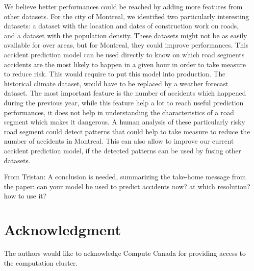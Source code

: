 \documentclass[conference]{IEEEtran}
\newcommand{\TG}[1]{\colorlet{saved}{.}\color{orange}From Tristan: #1\color{saved}}
\begin{document}
We believe better performances could be reached by adding more features
from other datasets. For the city of Montreal, we identified two
particularly interesting datasets: a dataset with the location and dates of
construction work on roads, and a dataset with the population density.
These datasets might not be as easily available for over areas, but for
Montreal, they could improve performances. This accident prediction model
can be used directly to know on which road segments accidents are the most
likely to happen in a given hour in order to take measure to reduce risk.
This would require to put this model into production. The historical
climate dataset, would have to be replaced by a weather forecast dataset.
The most important feature is the number of accidents which happened during
the previous year, while this feature help a lot to reach useful prediction
performances, it does not help in understanding the characteristics of a
road segment which makes it dangerous. A human analysis of these
particularly risky road segment could detect patterns that could help to
take measure to reduce the number of accidents in Montreal. This can also
allow to improve our current accident prediction model, if the detected
patterns can be used by fusing other datasets.

\TG{A conclusion is needed, summarizing the take-home message from the paper:
can your model be used to predict accidents now? at which resolution? how to use it?}

\section*{Acknowledgment}

The authors would like to acknowledge Compute Canada for providing access to the computation cluster.



\end{document}
